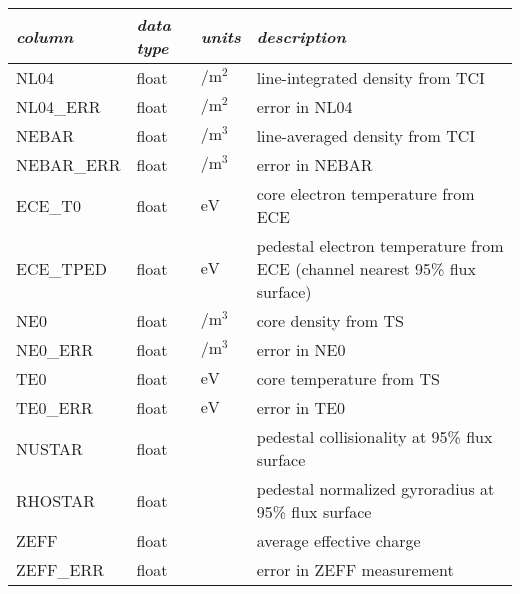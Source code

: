 \begin{table*}[h]
 \pushtooutside
 {\begin{tabu} to 143mm {X[2.348,l]X[1,c]X[1,c]X[4.348,c]}
   \toprule
   \emph{column} &
   \emph{data type} &
   \emph{units} &
   \emph{description}
   \\
   \midrule
   NL04 &
   float &
   $\si{\per\meter\squared}$ &
   line-integrated density from TCI
   \\
   NL04\_ERR &
   float &
   $\si{\per\meter\squared}$ &
   error in NL04
   \\
   NEBAR &
   float &
   $\si{\per\meter\cubed}$ &
   line-averaged density from TCI
   \\
   NEBAR\_ERR &
   float &
   $\si{\per\meter\cubed}$ &
   error in NEBAR
   \\
   ECE\_T0 &
   float &
   $\si{\electronvolt}$ &
   core electron temperature from ECE
   \\
   ECE\_TPED &
   float &
   $\si{\electronvolt}$ &
   pedestal electron temperature from ECE (channel nearest 95\% flux surface)
   \\
   NE0 &
   float &
   $\si{\per\meter\cubed}$ &
   core density from TS
   \\
   NE0\_ERR &
   float &
   $\si{\per\meter\cubed}$ &
   error in NE0
   \\
   TE0 &
   float &
   $\si{\electronvolt}$ &
   core temperature from TS
   \\
   TE0\_ERR &
   float &
   $\si{\electronvolt}$ &
   error in TE0
   \\
   NUSTAR &
   float &
   &
   pedestal collisionality at 95\% flux surface
   \\
   RHOSTAR &
   float &
   &
   pedestal normalized gyroradius at 95\% flux surface
   \\
   ZEFF &
   float &
   &
   average effective charge
   \\
   ZEFF\_ERR &
   float &
   &
   error in ZEFF measurement
   \\
   \bottomrule
  \end{tabu}}
\end{table*}

